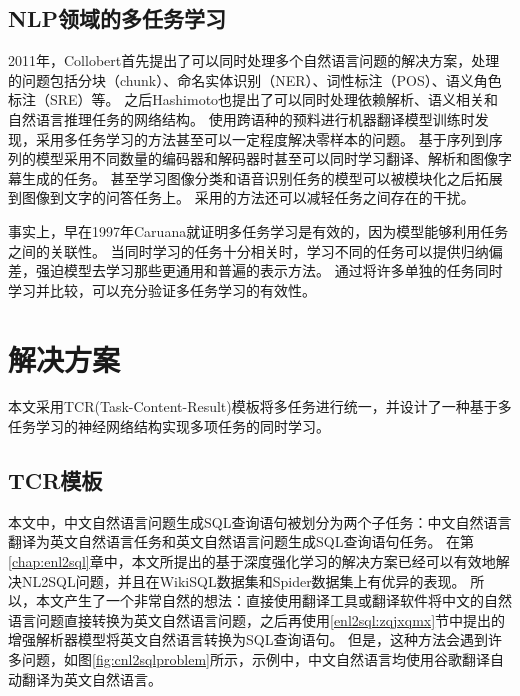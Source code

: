 \subsection{NLP领域的多任务学习}

2011年，Collobert\cite{collobert2011natural}首先提出了可以同时处理多个自然语言问题的解决方案，处理的问题包括分块（chunk）、命名实体识别（NER）、词性标注（POS）、语义角色标注（SRE）等。
之后Hashimoto\cite{hashimoto2017joint}也提出了可以同时处理依赖解析、语义相关和自然语言推理任务的网络结构。
使用跨语种的预料进行机器翻译模型训练时发现，采用多任务学习的方法\cite{johnson2017google}甚至可以一定程度解决零样本的问题。
基于序列到序列的模型采用不同数量的编码器和解码器时\cite{luong2015multi}甚至可以同时学习翻译、解析和图像字幕生成的任务。
甚至学习图像分类和语音识别任务的模型可以被模块化\cite{kaiser2017one}之后拓展到图像到文字的问答任务上\cite{xiong2016dynamic}。
采用\cite{ruder2017learning}的方法还可以减轻任务之间存在的干扰。

事实上，早在1997年Caruana\cite{caruana1997multitask}就证明多任务学习是有效的，因为模型能够利用任务之间的关联性。
当同时学习的任务十分相关时，学习不同的任务可以提供归纳偏差\cite{mitchell1980need}，强迫模型去学习那些更通用和普遍的表示方法。
通过将许多单独的任务同时学习并比较，可以充分验证多任务学习的有效性\cite{wang2018glue,poliak2018evaluation,poliak2018towards}。



\section{解决方案}

本文采用TCR(Task-Content-Result)模板将多任务进行统一，并设计了一种基于多任务学习的神经网络结构实现多项任务的同时学习。

\subsection{TCR模板}

本文中，中文自然语言问题生成SQL查询语句被划分为两个子任务：中文自然语言翻译为英文自然语言任务和英文自然语言问题生成SQL查询语句任务。
在第\ref{chap:enl2sql}章中，本文所提出的基于深度强化学习的解决方案已经可以有效地解决NL2SQL问题，并且在WikiSQL数据集和Spider数据集上有优异的表现。
所以，本文产生了一个非常自然的想法：直接使用翻译工具或翻译软件将中文的自然语言问题直接转换为英文自然语言问题，之后再使用\ref{enl2sql:zqjxqmx}节中提出的增强解析器模型将英文自然语言转换为SQL查询语句。
但是，这种方法会遇到许多问题，如图\ref{fig:cnl2sqlproblem}所示，示例中，中文自然语言均使用谷歌翻译自动翻译为英文自然语言。

